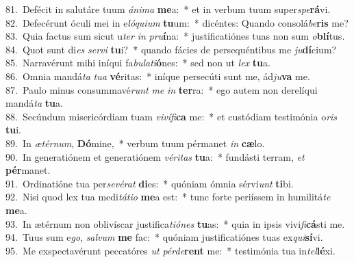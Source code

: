 {81.~}Defécit in salutáre tuum \textit{á}\textit{ni}\textit{ma} \textbf{me}a:~* et in verbum tuum super\textit{spe}\textbf{rá}vi.\\
{82.~}Defecérunt óculi mei in e\textit{ló}\textit{qui}\textit{um} \textbf{tu}um:~* dicéntes: Quando consolá\textit{be}\textbf{ris} me?\\
{83.~}Quia factus sum sicut u\textit{ter} \textit{in} \textit{pru}\textbf{í}na:~* justificatiónes tuas non sum \textit{o}\textbf{blí}tus.\\
{84.~}Quot sunt di\textit{es} \textit{ser}\textit{vi} \textbf{tu}i?~* quando fácies de persequéntibus me \textit{ju}\textbf{dí}cium?\\
{85.~}Narravérunt mihi iníqui fa\textit{bu}\textit{la}\textit{ti}\textbf{ó}nes:~* sed non ut \textit{lex} \textbf{tu}a.\\
{86.~}Omnia mandá\textit{ta} \textit{tu}\textit{a} \textbf{vé}ritas:~* iníque persecúti sunt me, ád\textit{ju}\textbf{va} me.\\
{87.~}Paulo minus consummavé\textit{runt} \textit{me} \textit{in} \textbf{ter}ra:~* ego autem non derelíqui mandá\textit{ta} \textbf{tu}a.\\
{88.~}Secúndum misericórdiam tuam \textit{vi}\textit{ví}\textit{fi}\textbf{ca} me:~* et custódiam testimónia o\textit{ris} \textbf{tu}i.\\
{89.~}In \textit{æ}\textit{tér}\textit{num}, \textbf{Dó}mine,~* verbum tuum pérmanet \textit{in} \textbf{cæ}lo.\\
{90.~}In generatiónem et generatiónem \textit{vé}\textit{ri}\textit{tas} \textbf{tu}a:~* fundásti terram, \textit{et} \textbf{pér}manet.\\
{91.~}Ordinatióne tua per\textit{se}\textit{vé}\textit{rat} \textbf{di}es:~* quóniam ómnia sérvi\textit{unt} \textbf{ti}bi.\\
{92.~}Nisi quod lex tua medi\textit{tá}\textit{ti}\textit{o} \textbf{me}a est:~* tunc forte periíssem in humilitá\textit{te} \textbf{me}a.\\
{93.~}In ætérnum non oblivíscar justifica\textit{ti}\textit{ó}\textit{nes} \textbf{tu}as:~* quia in ipsis vivi\textit{fi}\textbf{cá}sti me.\\
{94.~}Tuus sum e\textit{go}, \textit{sal}\textit{vum} \textbf{me} fac:~* quóniam justificatiónes tuas ex\textit{qui}\textbf{sí}vi.\\
{95.~}Me exspectavérunt peccatóres \textit{ut} \textit{pér}\textit{de}\textbf{rent} me:~* testimónia tua in\textit{tel}\textbf{lé}xi.\\

